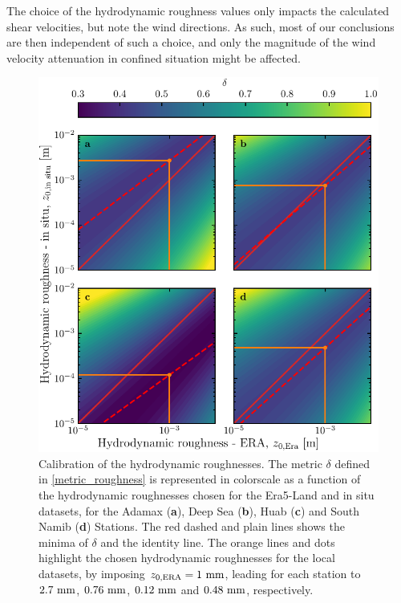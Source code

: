 The choice of the hydrodynamic roughness values only impacts the calculated shear velocities, but note the wind directions. As such, most of our conclusions are then independent of such a choice, and only the magnitude of the wind velocity attenuation in confined situation might be affected.


\begin{figure}
  \centering
  \includegraphics[scale=1]{Figures/Figure3_supp.pdf}
  \caption{Calibration of the hydrodynamic roughnesses. The metric $\delta$ defined in \eqref{metric_roughness} is represented in colorscale as a function of the hydrodynamic roughnesses chosen for the Era5-Land and in situ datasets, for the Adamax (\textbf{a}), Deep Sea (\textbf{b}), Huab (\textbf{c}) and South Namib (\textbf{d}) Stations. The red dashed and plain lines shows the minima of $\delta$ and the identity line. The orange lines and dots highlight the chosen hydrodynamic roughnesses for the local datasets, by imposing $z_{0, \textup{\textup{ERA}}} = 1~\textup{mm}$, leading for each station to $2.7~\textup{mm}$, $0.76~\textup{mm}$, $0.12~\textup{mm}$ and $0.48~\textup{mm}$, respectively.}
  \label{Fig3_supp}
\end{figure}


